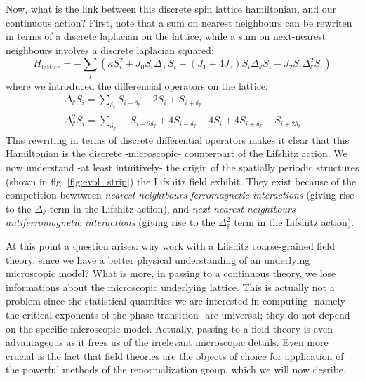  Now, what is the link between this discrete spin lattice hamiltonian, and our continuous action?
First, note that a sum on nearest neighbours can be rewriten in terms of a discrete laplacian on the lattice, while a sum on next-nearest neighbours involves a discrete laplacian squared:
\begin{equation}
H_{\text{lattice}} = -\sum_i \left( \kappa S_i^2 + J_0 S_i \Delta_\perp S_i + (J_1 + 4 J_2) S_i \Delta_\sslash S_i - J_2 S_i \Delta_\sslash^2 S_i \right)
\end{equation}
where we introduced the differencial operators on the lattice:
\begin{align}
\Delta_\sslash S_i = \sum_{\delta_\sslash} S_{i-\delta_\sslash} - 2 S_i + S_{i+\delta_\sslash} \\
\Delta_\sslash^2 S_i = \sum_{\delta_\sslash} -S_{i-2\delta_\sslash} +  4 S_{i-\delta_\sslash} - 4 S_i + 4S_{i+\delta_\sslash} - S_{i+2\delta_\sslash}
\end{align}
This rewriting in terms of discrete differential operators makes it clear that this Hamiltonian is the discrete -microscopic- counterpart of the Lifshitz action. We now understand -at least intuitively- the origin of the spatially periodic structures (shown in fig. \ref{fig:evol_strip}) the Lifshitz field exhibit. They exist because of the competition bewtween \textit{nearest neightbours ferromagnetic interactions} (giving rise to the $\Delta_\sslash$ term in the Lifshitz action), and \textit{next-nearest neightbours antiferromagnetic interactions} (giving rise to the $\Delta_\sslash^2$ term in the Lifshitz action).

At this point a question arises: why work with a Lifshitz coarse-grained field theory, since we have a better physical understanding of an underlying microscopic model? What is more, in passing to a continuous theory, we lose informations about the microscopic underlying lattice. 
This is actually not a problem since the statistical quantities we are interested in computing -namely the critical exponents of the phase transition- are universal; they do not depend on the specific microscopic model. Actually, passing to a field theory is even advantageous as it frees us of the irrelevant microscopic details. 
Even more crucial is the fact that field theories are the objects of choice for application of the powerful methods of the renormalization group, which we will now desribe.
